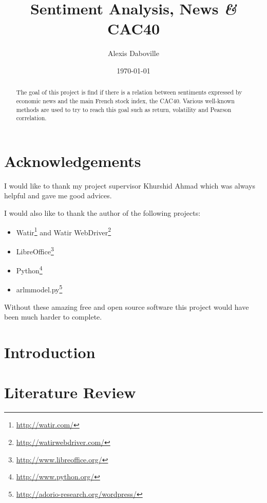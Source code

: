 \documentclass[12pt]{report}
\newcommand{\amp}{{\fontfamily{ppl}\selectfont\emph\&}}
\begin{document}
\onehalfspace

\title{Sentiment Analysis, News \amp{} CAC40}
\date{\today}
\author{Alexis Daboville}

\maketitle

\begin{abstract}
	The goal of this project is find if there is a relation between sentiments expressed by economic news and the main French stock index, the CAC40. Various well-known methods are used to try to reach this goal such as return, volatility and Pearson correlation.
\end{abstract}

\pagestyle{headings}
\tableofcontents
\listoffigures
\listoftables

\newpage

\chapter*{Acknowledgements}
I would like to thank my project supervisor Khurshid Ahmad which was always helpful and gave me good advices.

I would also like to thank the author of the following projects:
\begin{itemize}
	\item Watir\footnote{\url{http://watir.com/}} and Watir WebDriver\footnote{\url{http://watirwebdriver.com/}}
	\item LibreOffice\footnote{\url{http://www.libreoffice.org/}}
	\item Python\footnote{\url{http://www.python.org/}}
	\item arlmmodel.py\footnote{\url{http://adorio-research.org/wordpress/}}
\end{itemize}
Without these amazing free and open source software this project would have been much harder to complete.

\chapter{Introduction}

\chapter{Literature Review}
\end{document}
